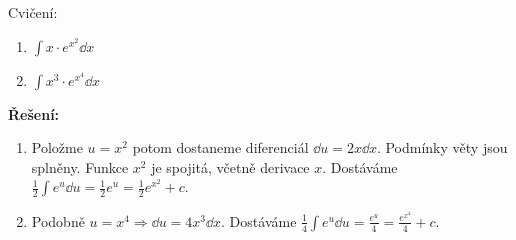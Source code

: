 \begin{mdframed}[style=mdexam]
  \begin{example}\label{MAI:exam119}
    Cvičení:
    \begin{enumerate}[label=\alph*)]
      \item \(\displaystyle\int x\cdot e^{x^2}\dd{x}\)
      \item \(\displaystyle\int x^3\cdot e^{x^4}\dd{x}\)
    \end{enumerate}

    \noindent\textbf{Řešení:}

    \begin{enumerate}[label=\alph*)]
      \item Položme \(u=x^2\) potom dostaneme diferenciál \(\dd{u}=2x\dd{x}\). Podmínky věty jsou
            splněny. Funkce \(x^2\) je spojitá, včetně derivace \(x\). Dostáváme
            \(\frac{1}{2}\int{e^u\dd{u}}=\frac{1}{2}e^u=\frac{1}{2}e^{x^2} + c\). 
      \item Podobně \(u=x^4 \Rightarrow \dd{u}=4x^3\dd{x}\). Dostáváme 
            \(\frac{1}{4}\int{e^u}\dd{u} = \frac{e^u}{4} = \frac{e^{x^4}}{4} + c \).
    \end{enumerate}
  \end{example}
\end{mdframed}